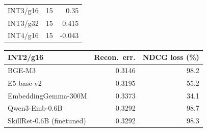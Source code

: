 \begin{table}[t]
\begin{tabular}{lrr}
INT3/g16 & 15 & 0.35 \\
INT3/g32 & 15 & 0.415 \\
INT4/g16 & 15 & -0.043 \\
\bottomrule
\end{tabular}\quad
\begin{tabular}{lrr}
\toprule
INT2/g16 & Recon.\ err. & NDCG loss (\%) \\
\midrule
BGE-M3 & 0.3146 & 98.2 \\
E5-base-v2 & 0.3195 & 55.2 \\
EmbeddingGemma-300M & 0.3373 & 34.1 \\
Qwen3-Emb-0.6B & 0.3292 & 98.7 \\
SkillRet-0.6B (finetuned) & 0.3292 & 98.3 \\
\bottomrule
\end{tabular}\end{table}
